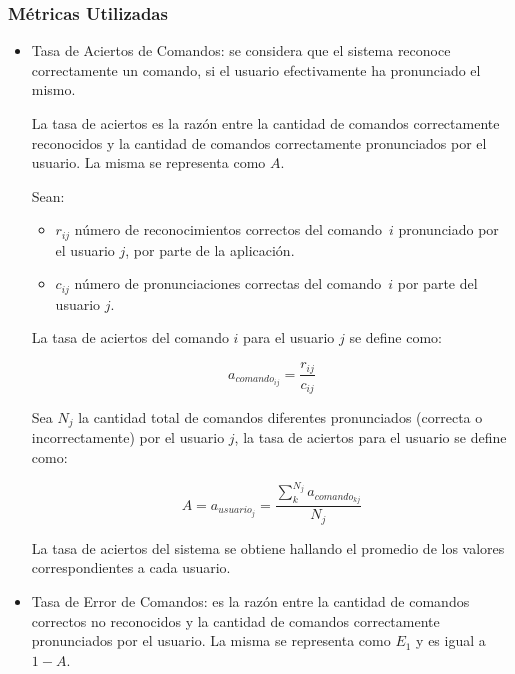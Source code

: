 \subsubsection{M\'etricas Utilizadas}
\begin{itemize}
	\item Tasa de Aciertos de Comandos: se considera que el sistema reconoce correctamente
	un comando, si el usuario efectivamente ha pronunciado el mismo.

	La tasa de aciertos es la raz\'on entre la cantidad de comandos correctamente reconocidos 
	y la cantidad de comandos correctamente pronunciados por el usuario. 
	La misma se representa como $A$.
	
	Sean:

	\begin{itemize}
		\item $r_{ij}$ n\'umero de reconocimientos correctos del \mbox{comando $i$} pronunciado por el usuario $j$,
		por parte de la aplicaci\'on.
		\item $c_{ij}$ n\'umero de pronunciaciones correctas del \mbox{comando $i$} por parte del usuario $j$.
	\end{itemize}
	La tasa de aciertos del comando $i$ para el usuario $j$ se define como: 

	\begin{equation*}
		a_{{comando}_{ij}}=\frac{r_{ij}}{c_{ij}}
	\end{equation*}


	Sea $N_{j}$ la cantidad total de comandos diferentes pronunciados (correcta o incorrectamente) por el usuario $j$,
	la tasa de aciertos para el usuario  se define como:
	
	\begin{equation*}
		A=a_{{usuario}_j}=\frac{\sum_k^{N_{j}}a_{{comando}_{kj}}}{N_{j}}
	\end{equation*}

	La tasa de aciertos del sistema se obtiene hallando el promedio de los valores correspondientes
	a cada usuario.

	\item Tasa de Error de Comandos: es la raz\'on entre la cantidad de comandos correctos no reconocidos 
	y la cantidad de comandos correctamente pronunciados por el usuario. 
	La misma se representa como $E_1$ y es igual a $1-A$.

\end{itemize}

